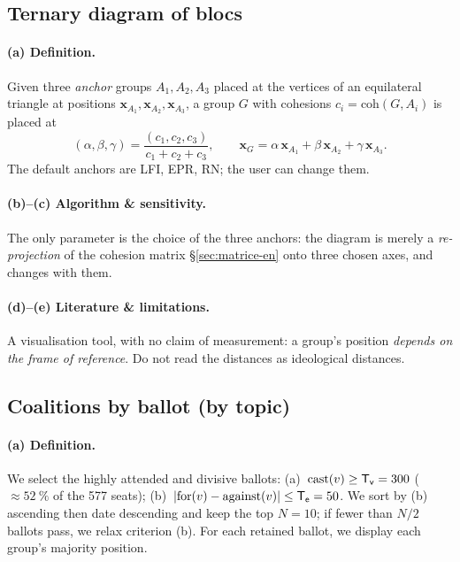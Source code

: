 \subsection{Ternary diagram of blocs}\label{sec:ternaire-en}

\paragraph{(a) Definition.} Given three \emph{anchor} groups $A_1,A_2,A_3$ placed
at the vertices of an equilateral triangle at positions $\mathbf{x}_{A_1},\mathbf{x}_{A_2},\mathbf{x}_{A_3}$,
a group $G$ with cohesions $c_i=\mathrm{coh}(G,A_i)$ is placed at
\[
(\alpha,\beta,\gamma)=\frac{(c_1,c_2,c_3)}{c_1+c_2+c_3},\qquad
\mathbf{x}_G=\alpha\,\mathbf{x}_{A_1}+\beta\,\mathbf{x}_{A_2}+\gamma\,\mathbf{x}_{A_3}.
\]
The default anchors are LFI, EPR, RN; the user can change them.

\paragraph{(b)--(c) Algorithm \& sensitivity.} The only \og{}parameter\fg{} is the
choice of the three anchors: the diagram is merely a \emph{re-projection} of the
cohesion matrix §\ref{sec:matrice-en} onto three chosen axes, and changes with
them.

\paragraph{(d)--(e) Literature \& limitations.} A visualisation tool, with no claim
of measurement: a group's position \emph{depends on the frame of reference}. Do
not read the distances as ideological distances.

\subsection{Coalitions by ballot (by topic)}\label{sec:coalitions-en}

\paragraph{(a) Definition.} We select the \og{}highly attended and divisive\fg{}
ballots: (a)~$\text{cast}(v)\ge \mathsf{T_v}=300$ ($\approx 52~\%$ of the 577 seats);
(b)~$|\mathrm{for}(v)-\mathrm{against}(v)|\le \mathsf{T_e}=50$. We sort by (b)
ascending then date descending and keep the top $N=10$; if fewer than $N/2$
ballots pass, we relax criterion (b). For each retained ballot, we display each
group's majority position.

